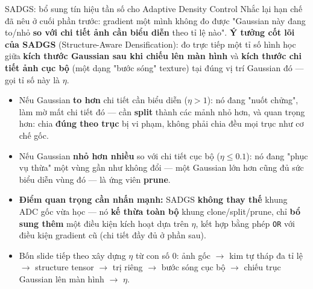 
\begin{frame}{SADGS: bổ sung tín hiệu tần số cho Adaptive Density Control}
\scriptsize
Nhắc lại hạn chế đã nêu ở cuối phần trước: gradient một mình không đo được "Gaussian này đang to/nhỏ \textbf{so với chi
tiết ảnh cần biểu diễn} theo tỉ lệ nào". \textbf{Ý tưởng cốt lõi của SADGS} (Structure-Aware Densification): đo trực
tiếp một tỉ số hình học giữa \textbf{kích thước Gaussian sau khi chiếu lên màn hình} và \textbf{kích thước chi tiết ảnh
cục bộ} (một dạng "bước sóng" texture) tại đúng vị trí Gaussian đó --- gọi tỉ số này là $\eta$.
\begin{itemize}\itemsep2pt
    \item Nếu Gaussian \textbf{to hơn} chi tiết cần biểu diễn ($\eta>1$): nó đang "nuốt chửng", làm mờ mất chi tiết đó
    --- cần \textbf{split} thành các mảnh nhỏ hơn, và quan trọng hơn: chia \textbf{đúng theo trục} bị vi phạm, không
    phải chia đều mọi trục như cơ chế gốc.
    \item Nếu Gaussian \textbf{nhỏ hơn nhiều} so với chi tiết cục bộ ($\eta\le0.1$): nó đang "phục vụ thừa" một vùng gần
    như không đổi --- một Gaussian lớn hơn cũng đủ sức biểu diễn vùng đó --- là ứng viên \textbf{prune}.
    \item \textbf{Điểm quan trọng cần nhấn mạnh:} SADGS \textbf{không thay thế} khung ADC gốc vừa học --- nó \textbf{kế
    thừa toàn bộ} khung clone/split/prune, chỉ \textbf{bổ sung thêm} một điều kiện kích hoạt dựa trên $\eta$, kết hợp
    bằng phép \texttt{OR} với điều kiện gradient cũ (chi tiết đầy đủ ở phần sau).
    \item Bốn slide tiếp theo xây dựng $\eta$ từ con số $0$: ảnh gốc $\to$ kim tự tháp đa tỉ lệ $\to$ structure tensor
    $\to$ trị riêng $\to$ bước sóng cục bộ $\to$ chiếu trục Gaussian lên màn hình $\to$ $\eta$.
\end{itemize}
\end{frame}

